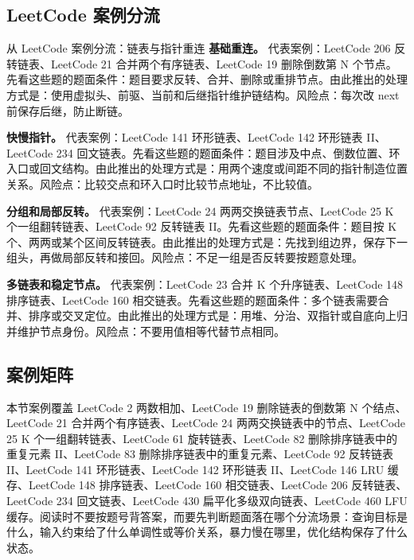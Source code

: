 \subsection{LeetCode 案例分流}

\begin{principlebox}{从 LeetCode 案例分流：链表与指针重连}
\textbf{基础重连。}
代表案例：LeetCode 206 反转链表、LeetCode 21 合并两个有序链表、LeetCode 19 删除倒数第 N 个节点。先看这些题的题面条件：题目要求反转、合并、删除或重排节点。由此推出的处理方式是：使用虚拟头、前驱、当前和后继指针维护链结构。风险点：每次改 next 前保存后继，防止断链。

\textbf{快慢指针。}
代表案例：LeetCode 141 环形链表、LeetCode 142 环形链表 II、LeetCode 234 回文链表。先看这些题的题面条件：题目涉及中点、倒数位置、环入口或回文结构。由此推出的处理方式是：用两个速度或间距不同的指针制造位置关系。风险点：比较交点和环入口时比较节点地址，不比较值。

\textbf{分组和局部反转。}
代表案例：LeetCode 24 两两交换链表节点、LeetCode 25 K 个一组翻转链表、LeetCode 92 反转链表 II。先看这些题的题面条件：题目按 K 个、两两或某个区间反转链表。由此推出的处理方式是：先找到组边界，保存下一组头，再做局部反转和接回。风险点：不足一组是否反转要按题意处理。

\textbf{多链表和稳定节点。}
代表案例：LeetCode 23 合并 K 个升序链表、LeetCode 148 排序链表、LeetCode 160 相交链表。先看这些题的题面条件：多个链表需要合并、排序或交叉定位。由此推出的处理方式是：用堆、分治、双指针或自底向上归并维护节点身份。风险点：不要用值相等代替节点相同。

\end{principlebox}

\subsection{案例矩阵}

本节案例覆盖 LeetCode 2 两数相加、LeetCode 19 删除链表的倒数第 N 个结点、LeetCode 21 合并两个有序链表、LeetCode 24 两两交换链表中的节点、LeetCode 25 K 个一组翻转链表、LeetCode 61 旋转链表、LeetCode 82 删除排序链表中的重复元素 II、LeetCode 83 删除排序链表中的重复元素、LeetCode 92 反转链表 II、LeetCode 141 环形链表、LeetCode 142 环形链表 II、LeetCode 146 LRU 缓存、LeetCode 148 排序链表、LeetCode 160 相交链表、LeetCode 206 反转链表、LeetCode 234 回文链表、LeetCode 430 扁平化多级双向链表、LeetCode 460 LFU 缓存。阅读时不要按题号背答案，而要先判断题面落在哪个分流场景：查询目标是什么，输入约束给了什么单调性或等价关系，暴力慢在哪里，优化结构保存了什么状态。

